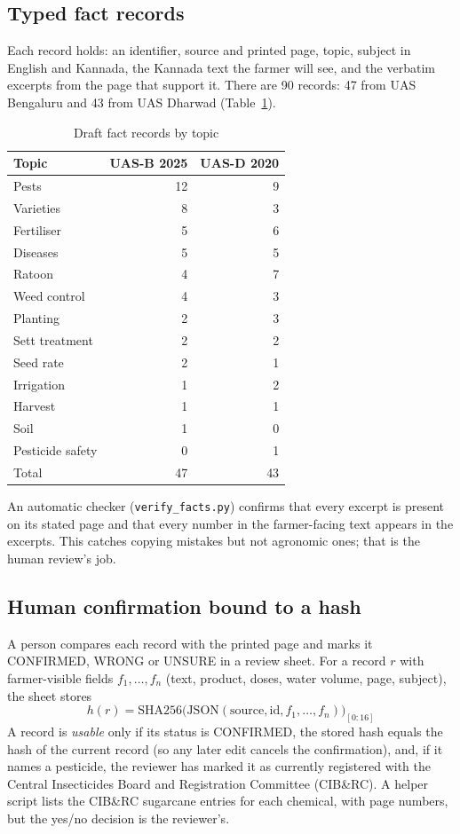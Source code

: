 \subsection{Typed fact records}
Each record holds: an identifier, source and printed page, topic, subject in English and
Kannada, the Kannada text the farmer will see, and the verbatim excerpts from the page that
support it. There are 90 records: 47 from UAS Bengaluru and 43 from UAS Dharwad
(Table~\ref{tab:records}).

\begin{table}[h]
\centering
\caption{Draft fact records by topic}
\label{tab:records}
\begin{tabular}{lrr}
\toprule
Topic & UAS-B 2025 & UAS-D 2020\\
\midrule
Pests & 12 & 9\\
Varieties & 8 & 3\\
Fertiliser & 5 & 6\\
Diseases & 5 & 5\\
Ratoon & 4 & 7\\
Weed control & 4 & 3\\
Planting & 2 & 3\\
Sett treatment & 2 & 2\\
Seed rate & 2 & 1\\
Irrigation & 1 & 2\\
Harvest & 1 & 1\\
Soil & 1 & 0\\
Pesticide safety & 0 & 1\\
\midrule
Total & 47 & 43\\
\bottomrule
\end{tabular}
\end{table}

An automatic checker (\texttt{verify\_facts.py}) confirms that every excerpt is present on
its stated page and that every number in the farmer-facing text appears in the excerpts.
This catches copying mistakes but not agronomic ones; that is the human review's job.

\subsection{Human confirmation bound to a hash}
A person compares each record with the printed page and marks it CONFIRMED, WRONG or
UNSURE in a review sheet. For a record $r$ with farmer-visible fields
$f_1,\dots,f_n$ (text, product, doses, water volume, page, subject), the sheet stores
\begin{equation}
  h(r) = \mathrm{SHA256}\bigl(\mathrm{JSON}(\text{source}, \text{id}, f_1,\dots,f_n)\bigr)_{[0:16]}
\end{equation}
A record is \emph{usable} only if its status is CONFIRMED, the stored hash equals the
hash of the current record (so any later edit cancels the confirmation), and, if it names a
pesticide, the reviewer has marked it as currently registered with the Central Insecticides
Board and Registration Committee (CIB\&RC). A helper script lists the CIB\&RC sugarcane
entries for each chemical, with page numbers, but the yes/no decision is the reviewer's.

